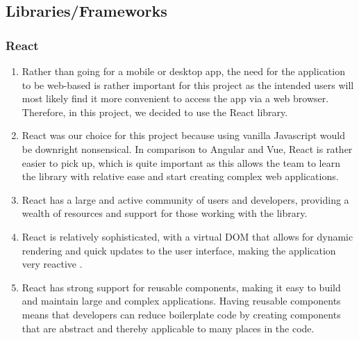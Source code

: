 \documentclass[singlespacing,12pt,parskip,headsepline,consistentlayout]{article}
\begin{document}
\subsection{Libraries/Frameworks}

\subsubsection{React}

\begin{enumerate}
    \item Rather than going for a mobile or desktop app, the need for the application to be web-based is rather important for this project as the intended users will most likely find it more convenient to access the app via a web browser. Therefore, in this project, we decided to use the React library.
    \item React was our choice for this project because using vanilla Javascript would be downright nonsensical. In comparison to Angular and Vue, React is rather easier to pick up, which is quite important as this allows the team to learn the library with relative ease and start creating complex web applications.
    \item React has a large and active community of users and developers, providing a wealth of resources and support for those working with the library.
    \item React is relatively sophisticated, with a virtual DOM that allows for dynamic rendering and quick updates to the user interface, making the application very reactive \cite{reactDocs}.
    \item React has strong support for reusable components, making it easy to build and maintain large and complex applications. Having reusable components means that developers can reduce boilerplate code by creating components that are abstract and thereby applicable to many places in the code.
\end{enumerate}
\end{document}

